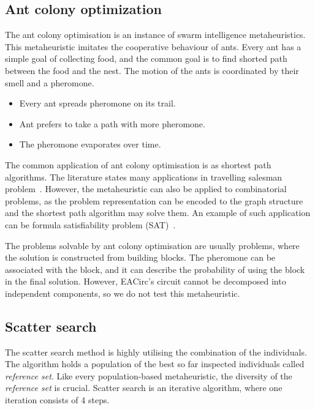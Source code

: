 \documentclass[
    digital,    %
    oneside,    %
    color,
    11pt,
    nocover,
    notable,
    nolof,
    nolot,
]{fithesis3}
\begin{document}
\subsection{Ant colony optimization}
\label{subsec:opt-popul-aco}

The ant colony optimisation is an instance of swarm intelligence metaheuristics. This metaheuristic imitates the cooperative behaviour of ants. Every ant has a simple goal of collecting food, and the common goal is to find shorted path between the food and the nest. The motion of the ants is coordinated by their smell and a pheromone.

\begin{itemize}
    \item Every ant spreads pheromone on its trail.
    \item Ant prefers to take a path with more pheromone.
    \item The pheromone evaporates over time.
\end{itemize}

The common application of ant colony optimisation is as shortest path algorithms. The literature states many applications in travelling salesman problem~\cite{dorigo1997ant}. However, the metaheuristic can also be applied to combinatorial problems, as the problem representation can be encoded to the graph structure and the shortest path algorithm may solve them. An example of such application can be formula satisfiability problem (SAT)~\cite{moritz2010solving}.

The problems solvable by ant colony optimisation are usually problems, where the solution is constructed from building blocks. The pheromone can be associated with the block, and it can describe the probability of using the block in the final solution. However, EACirc's circuit cannot be decomposed into independent components, so we do not test this metaheuristic.

\subsection{Scatter search}
\label{subsec:opt-popul-scatter}

The scatter search method is highly utilising the combination of the individuals. The algorithm holds a population of the best so far inspected individuals called \textit{reference set}. Like every population-based metaheuristic, the diversity of the \textit{reference set} is crucial. Scatter search is an iterative algorithm, where one iteration consists of 4 steps.
\end{document}
